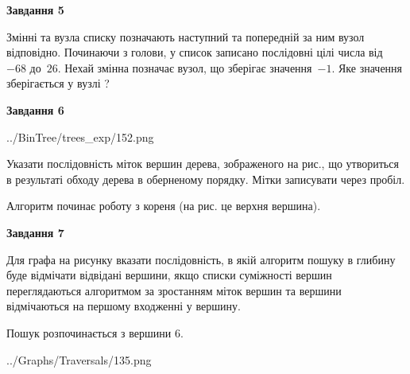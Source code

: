 \documentclass[12pt, ukrainian]{article}
\begin{document}
{\begin {large}
{\begin {center}\textbf{Завдання 5}\end {center}}\par
Змінні  та  вузла списку позначають наступний та попередній за ним вузол відповідно. Починаючи з голови, у список записано послідовні цілі числа від~$-68$ до~$26$. Нехай змінна  позначає вузол, що зберігає значення~$-1$.
Яке значення зберігається у вузлі  ?\par
\newpage

{\begin {center}\textbf{Завдання 6}\end {center}}\par

\begin{center}
	{../BinTree/trees_exp/152.png}
\end{center}
Указати послідовність міток вершин дерева, зображеного на рис., що утвориться в результаті обходу дерева в оберненому порядку. Мітки записувати через пробіл.\par Алгоритм починає роботу з кореня (на рис. це верхня вершина).\par
\newpage

{\begin {center}\textbf{Завдання 7}\end {center}}\par
Для графа на рисунку вказати послідовність, в якій алгоритм пошуку в глибину буде відмічати відвідані вершини, якщо списки суміжності вершин переглядаються алгоритмом за зростанням міток вершин та вершини відмічаються на першому вход\-женні у вершину.\par
Пошук розпочинається з вершини 6.\par

\begin{center}
	{../Graphs/Traversals/135.png}
\end{center}\par
\newpage


\end{large}}
\end{document}
